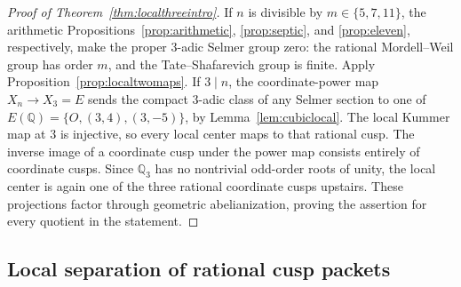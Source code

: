 \begin{proof}[Proof of Theorem~\ref{thm:localthreeintro}]
If $n$ is divisible by $m\in\{5,7,11\}$, the arithmetic
Propositions~\ref{prop:arithmetic}, \ref{prop:septic}, and
\ref{prop:eleven}, respectively, make the proper $3$-adic Selmer
group zero: the rational Mordell--Weil group has order $m$, and the
Tate--Shafarevich group is finite. Apply Proposition~\ref{prop:localtwomaps}.
If $3\mid n$, the coordinate-power map $X_n\to X_3=E$
sends the compact $3$-adic class of any Selmer section to one of
$E(\mathbb Q)=\{O,(3,4),(3,-5)\}$, by Lemma~\ref{lem:cubiclocal}.
The local Kummer map at $3$ is injective, so every local center maps
to that rational cusp. The inverse image of a coordinate cusp under
the power map consists entirely of coordinate cusps. Since
$\mathbb Q_3$ has no nontrivial odd-order roots of unity, the local
center is again one of the three rational coordinate cusps upstairs.
These projections factor through geometric abelianization, proving
the assertion for every quotient in the statement.
\end{proof}


\subsection{Local separation of rational cusp packets}
\label{subsec:lm-affine-packet-separation}

